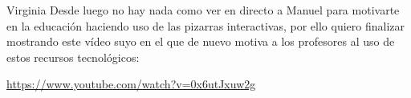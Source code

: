 \begin{opin}{\virgicolor}{Virginia}
Desde luego no hay nada como ver en directo a Manuel para motivarte en la educación haciendo uso de las pizarras interactivas, por ello quiero finalizar mostrando este vídeo suyo en el que de nuevo motiva a los profesores al uso de estos recursos tecnológicos:

\url{https://www.youtube.com/watch?v=0x6utJxuw2g}


\end{opin}
